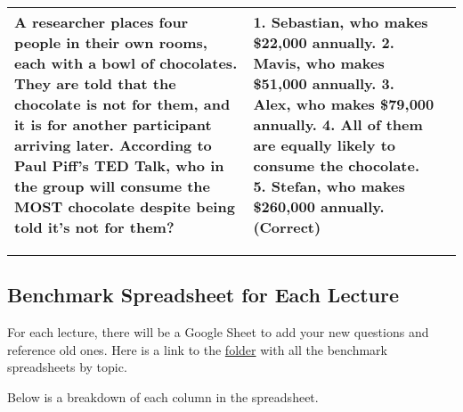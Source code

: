 \documentclass[
]{article}
\begin{document}
\begin{longtable}[]{@{}lll@{}}
\begin{minipage}[t]{0.38\columnwidth}
A researcher places four people in their own rooms, each with a bowl of chocolates. They are told that the chocolate is not for them, and it is for another participant arriving later. According to Paul Piff's TED Talk, who in the group will consume the MOST chocolate despite being told it's not for them?\strut
\end{minipage} & \begin{minipage}[t]{0.48\columnwidth}\raggedright
1. Sebastian, who makes \$22,000 annually. 2. Mavis, who makes \$51,000 annually. 3. Alex, who makes \$79,000 annually. 4. All of them are equally likely to consume the chocolate. \textbf{5. Stefan, who makes \$260,000 annually. (Correct)}\strut
\end{minipage}\tabularnewline
\bottomrule
\end{longtable}

\begin{center}\rule{0.5\linewidth}{0.5pt}\end{center}

\hypertarget{benchmark-spreadsheet-for-each-lecture}{%
\subsection{Benchmark Spreadsheet for Each Lecture}\label{benchmark-spreadsheet-for-each-lecture}}

For each lecture, there will be a Google Sheet to add your new questions and reference old ones. Here is a link to the \href{https://drive.google.com/drive/u/2/folders/1bng_NaPPPm0RomhilhfiZkOEFT6XKk87}{folder} with all the benchmark spreadsheets by topic.

Below is a breakdown of each column in the spreadsheet.
\end{document}
